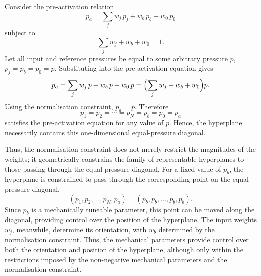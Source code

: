 \documentclass[11pt,a4paper]{article}
\numberwithin{equation}{section}
\begin{document}
\begin{appendices}
Consider the pre-activation relation
\begin{equation}
  p_a = \sum_j w_j\,p_j + w_b\,p_b + w_0\,p_0
\end{equation}
subject to
\begin{equation}
  \sum_j w_j + w_b + w_0 = 1 .
\end{equation}
Let all input and reference pressures be equal to some arbitrary pressure $p$, $p_j = p_b = p_0 = p$. Substituting
into the pre-activation equation gives
\begin{equation}
  p_a = \sum_j w_j\,p + w_b\,p + w_0\,p = \Bigl(\sum_j w_j + w_b + w_0\Bigr)p .
\end{equation}
Using the normalisation constraint, $p_a = p$. Therefore
\begin{equation}
  \boxed{p_1 = p_2 = \cdots = p_N = p_b = p_0 = p_a}
\end{equation}
satisfies the pre-activation equation for any value of $p$. Hence, the hyperplane necessarily contains this
one-dimensional equal-pressure diagonal.

Thus, the normalisation constraint does not merely restrict the magnitudes of the weights; it geometrically
constrains the family of representable hyperplanes to those passing through the equal-pressure diagonal. For a
fixed value of $p_b$, the hyperplane is constrained to pass through the corresponding point on the equal-pressure
diagonal,
\begin{equation}
  (p_1, p_2, \ldots, p_N, p_a) = (p_b, p_b, \ldots, p_b, p_b) .
\end{equation}
Since $p_b$ is a mechanically tuneable parameter, this point can be moved along the diagonal, providing control over
the position of the hyperplane. The input weights $w_j$, meanwhile, determine its orientation, with $w_b$ determined
by the normalisation constraint. Thus, the mechanical parameters provide control over both the orientation and
position of the hyperplane, although only within the restrictions imposed by the non-negative mechanical parameters
and the normalisation constraint.

\end{appendices}
\end{document}
